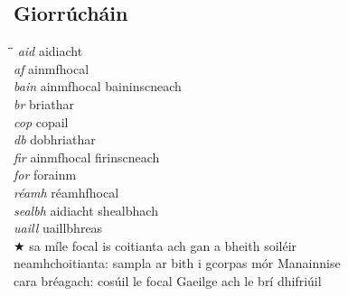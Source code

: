 \documentclass[8pt,twocolumn,openany]{extbook}
\begin{document}
\begin{frontmatter}
\chapter*{Giorr\'uch\'ain} 
\thispagestyle{empty}
\begin{tabbing}
\hspace*{12ex}\=\hspace{12ex}\=\kill
\> {\it aid} \> aidiacht \\
\> {\it af} \> ainmfhocal \\
\> {\it bain} \> ainmfhocal baininscneach \\
\> {\it br} \> briathar \\
\> {\it cop} \> copail \\
\> {\it db} \> dobhriathar \\
\> {\it fir} \> ainmfhocal firinscneach \\
\> {\it for} \> forainm \\
\> {\it réamh} \> réamhfhocal \\
\> {\it sealbh} \> aidiacht shealbhach \\
\> {\it uaill} \> uaillbhreas \\
\> $\bigstar$ \> sa míle focal is coitianta ach gan a bheith soiléir \\
\> \textdagger \> neamhchoitianta: sampla ar bith i gcorpas mór Manainnise \\
\> \textdbend \> cara bréagach: cosúil le focal Gaeilge ach le brí dhifriúil \\
\end{tabbing}


\newpage
\thispagestyle{empty}

\end{frontmatter}

\begin{mainmatter}
\twocolumn
{}
\lhead{\large\bf \rightmark}
\rhead{\large\bf \leftmark}

\appendix
\lhead{}
\rhead{}
\end{mainmatter}
\end{document}

